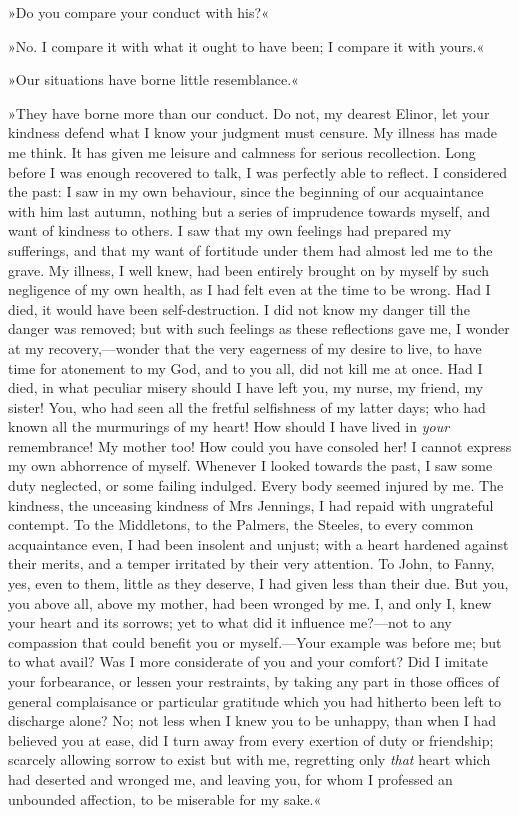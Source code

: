 »Do you compare your conduct with his?«

»No. I compare it with what it ought to have been; I compare it with yours.«

»Our situations have borne little resemblance.«

»They have borne more than our conduct. Do not, my dearest Elinor, let your kindness defend what I know your judgment must censure. My illness has made me think. It has given me leisure and calmness for serious recollection. Long before I was enough recovered to talk, I was perfectly able to reflect. I considered the past: I saw in my own behaviour, since the beginning of our acquaintance with him last autumn, nothing but a series of imprudence towards myself, and want of kindness to others. I saw that my own feelings had prepared my sufferings, and that my want of fortitude under them had almost led me to the grave. My illness, I well knew, had been entirely brought on by myself by such negligence of my own health, as I had felt even at the time to be wrong. Had I died, it would have been self-destruction. I did not know my danger till the danger was removed; but with such feelings as these reflections gave me, I wonder at my recovery,—wonder that the very eagerness of my desire to live, to have time for atonement to my God, and to you all, did not kill me at once. Had I died, in what peculiar misery should I have left you, my nurse, my friend, my sister! You, who had seen all the fretful selfishness of my latter days; who had known all the murmurings of my heart! How should I have lived in \textit{your} remembrance! My mother too! How could you have consoled her! I cannot express my own abhorrence of myself. Whenever I looked towards the past, I saw some duty neglected, or some failing indulged. Every body seemed injured by me. The kindness, the unceasing kindness of Mrs Jennings, I had repaid with ungrateful contempt. To the Middletons, to the Palmers, the Steeles, to every common acquaintance even, I had been insolent and unjust; with a heart hardened against their merits, and a temper irritated by their very attention. To John, to Fanny, yes, even to them, little as they deserve, I had given less than their due. But you, you above all, above my mother, had been wronged by me. I, and only I, knew your heart and its sorrows; yet to what did it influence me?—not to any compassion that could benefit you or myself.—Your example was before me; but to what avail? Was I more considerate of you and your comfort? Did I imitate your forbearance, or lessen your restraints, by taking any part in those offices of general complaisance or particular gratitude which you had hitherto been left to discharge alone? No; not less when I knew you to be unhappy, than when I had believed you at ease, did I turn away from every exertion of duty or friendship; scarcely allowing sorrow to exist but with me, regretting only \textit{that} heart which had deserted and wronged me, and leaving you, for whom I professed an unbounded affection, to be miserable for my sake.«

